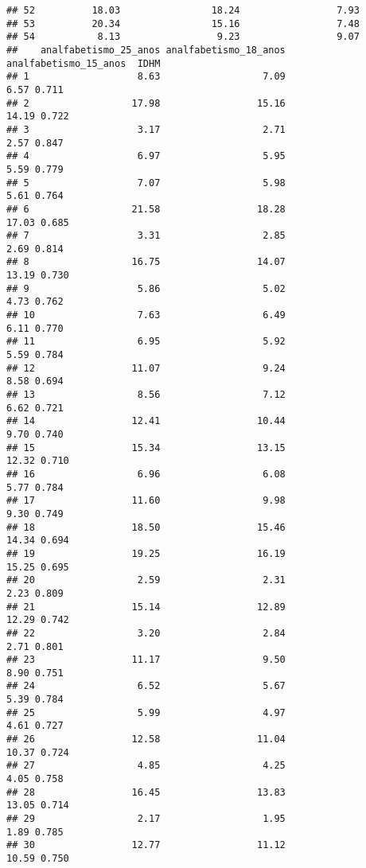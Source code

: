 \documentclass[
]{article}
\begin{document}
\begin{verbatim}
## 52          18.03                18.24                 7.93
## 53          20.34                15.16                 7.48
## 54           8.13                 9.23                 9.07
##    analfabetismo_25_anos analfabetismo_18_anos analfabetismo_15_anos  IDHM
## 1                   8.63                  7.09                  6.57 0.711
## 2                  17.98                 15.16                 14.19 0.722
## 3                   3.17                  2.71                  2.57 0.847
## 4                   6.97                  5.95                  5.59 0.779
## 5                   7.07                  5.98                  5.61 0.764
## 6                  21.58                 18.28                 17.03 0.685
## 7                   3.31                  2.85                  2.69 0.814
## 8                  16.75                 14.07                 13.19 0.730
## 9                   5.86                  5.02                  4.73 0.762
## 10                  7.63                  6.49                  6.11 0.770
## 11                  6.95                  5.92                  5.59 0.784
## 12                 11.07                  9.24                  8.58 0.694
## 13                  8.56                  7.12                  6.62 0.721
## 14                 12.41                 10.44                  9.70 0.740
## 15                 15.34                 13.15                 12.32 0.710
## 16                  6.96                  6.08                  5.77 0.784
## 17                 11.60                  9.98                  9.30 0.749
## 18                 18.50                 15.46                 14.34 0.694
## 19                 19.25                 16.19                 15.25 0.695
## 20                  2.59                  2.31                  2.23 0.809
## 21                 15.14                 12.89                 12.29 0.742
## 22                  3.20                  2.84                  2.71 0.801
## 23                 11.17                  9.50                  8.90 0.751
## 24                  6.52                  5.67                  5.39 0.784
## 25                  5.99                  4.97                  4.61 0.727
## 26                 12.58                 11.04                 10.37 0.724
## 27                  4.85                  4.25                  4.05 0.758
## 28                 16.45                 13.83                 13.05 0.714
## 29                  2.17                  1.95                  1.89 0.785
## 30                 12.77                 11.12                 10.59 0.750

\end{verbatim}
\end{document}
